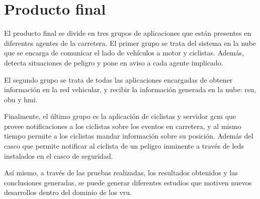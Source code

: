 \chapter{Producto final}
El producto final se divide en tres grupos de aplicaciones que están presentes en diferentes agentes de la carretera. El primer grupo se trata del sistema en la nube que se encarga de comunicar el lado de vehículos a motor y ciclistas. Además, detecta situaciones de peligro y pone en aviso a cada agente implicado. 

El segundo grupo se trata de todas las aplicaciones encargadas de obtener información en la red vehicular, y recibir la información generada en la nube: \gls{rsu}, \gls{obu} y \gls{hmi}. 

Finalmente, el último grupo es la aplicación de ciclistas y servidor \gls{gcm} que provee notificaciones a los ciclistas sobre los eventos en carretera, y al mismo tiempo permite a los ciclistas mandar información sobre su posición. Además del casco  que permite notificar al ciclista de un peligro inminente a través de leds instalados en el casco de seguridad.

Así mismo, a través de las pruebas realizadas, los resultados obtenidos y las conclusiones generadas, se puede generar diferentes estudios que motiven nuevos desarrollos dentro del dominio de los \gls{vru}.